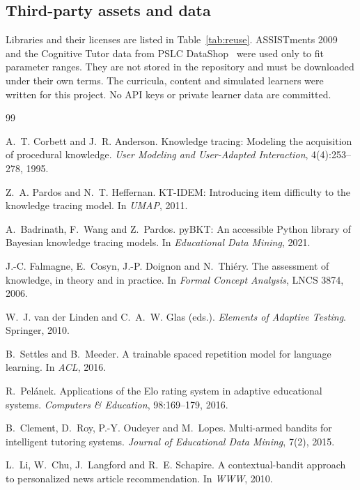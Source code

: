 \documentclass[11pt,a4paper]{article}
\begin{document}
\subsection{Third-party assets and data}

Libraries and their licenses are listed in Table~\ref{tab:reuse}. ASSISTments 2009~\cite{feng2009} and the Cognitive Tutor data from PSLC DataShop~\cite{koedinger2010} were used only to fit parameter ranges. They are not stored in the repository and must be downloaded under their own terms. The curricula, content and simulated learners were written for this project. No API keys or private learner data are committed.

\begin{thebibliography}{99}

 A.~T. Corbett and J.~R. Anderson. Knowledge tracing: Modeling the acquisition of procedural knowledge. \emph{User Modeling and User-Adapted Interaction}, 4(4):253--278, 1995.

 Z.~A. Pardos and N.~T. Heffernan. KT-IDEM: Introducing item difficulty to the knowledge tracing model. In \emph{UMAP}, 2011.

 A.~Badrinath, F.~Wang and Z.~Pardos. pyBKT: An accessible Python library of Bayesian knowledge tracing models. In \emph{Educational Data Mining}, 2021.

 J.-C. Falmagne, E.~Cosyn, J.-P. Doignon and N.~Thi\'ery. The assessment of knowledge, in theory and in practice. In \emph{Formal Concept Analysis}, LNCS 3874, 2006.

 W.~J. van der Linden and C.~A.~W. Glas (eds.). \emph{Elements of Adaptive Testing}. Springer, 2010.

 B.~Settles and B.~Meeder. A trainable spaced repetition model for language learning. In \emph{ACL}, 2016.

 R.~Pel\'anek. Applications of the Elo rating system in adaptive educational systems. \emph{Computers \& Education}, 98:169--179, 2016.

 B.~Clement, D.~Roy, P.-Y. Oudeyer and M.~Lopes. Multi-armed bandits for intelligent tutoring systems. \emph{Journal of Educational Data Mining}, 7(2), 2015.

 L.~Li, W.~Chu, J.~Langford and R.~E. Schapire. A contextual-bandit approach to personalized news article recommendation. In \emph{WWW}, 2010.


\end{thebibliography}
\end{document}
